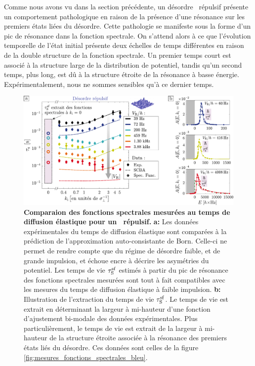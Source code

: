 Comme nous avons vu dans la section précédente, un désordre \speckle\ répulsif présente un comportement pathologique en raison de la présence d'une résonance sur les premiers états liées du désordre. Cette pathologie se manifeste sous la forme d'un pic de résonance dans la fonction spectrale. On s'attend alors à ce que l'évolution temporelle de l'état initial présente deux échelles de temps différentes en raison de la double structure de la fonction spectrale. Un premier temps court est associé à la structure large de la distribution de potentiel, tandis qu'un second temps, plus long, est dû à la structure étroite de la résonance à basse énergie. Expérimentalement, nous ne sommes sensibles qu'à ce dernier temps.

\begin{figure}
\centering
\includegraphics[width=\textwidth]{Fig/TauS_NJP/comparaison_specfunc_taus_bleu.pdf}
\caption{\textbf{Comparaion des fonctions spectrales mesurées au temps de diffusion élastique pour un \speckle\ répulsif.} \textbf{a:} Les données expérimentales du temps de diffusion élastique sont comparées à la prédiction de l'approximation auto-consistante de Born. Celle-ci ne permet de rendre compte que du régime de désordre faible, et de grande impulsion, et échoue encre à décrire les asymétries du potentiel. Les temps de vie $\tau_{\mathrm{S}}^{\mathrm{sf}}$ estimés à partir du pic de résonance des fonctions spectrales mesurées sont tout à fait compatibles avec les mesures du temps de diffusion élastique à faible impulsion. \textbf{b:} Illustration de l'extraction du temps de vie $\tau_{\mathrm{S}}^{\mathrm{sf}}$. Le temps de vie est extrait en déterminant la largeur à mi-hauteur d'une fonction d'ajustement bi-modale des données expérimentales. Plus particulièrement, le temps de vie est extrait de la largeur à mi-hauteur de la structure étroite associée à la résonance des premiers états liés du désordre. Ces données sont celles de la figure \ref{fig:mesures_fonctions_spectrales_bleu}.}
\label{fig:comparaison_taus_specfunc_bleu}
\end{figure}


